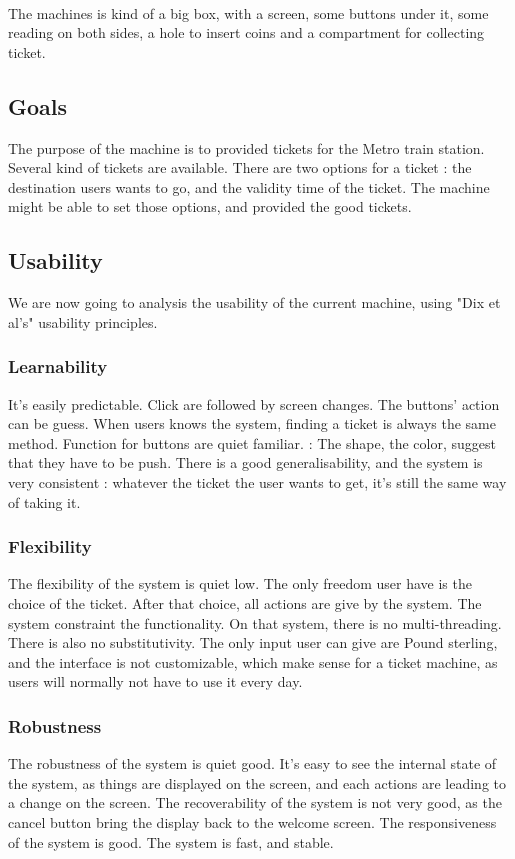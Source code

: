 \documentclass[a4paper,12pt]{article} %
\begin{document}
\paragraph{}The machines is kind of a big box, with a screen, some buttons under it, some reading on both sides, a hole to insert coins and a compartment for collecting ticket.
\subsection{Goals}
The purpose of the machine is to provided tickets for the Metro train station. Several kind of tickets are available. There are two options for a ticket : the destination users wants to go, and the validity time of the ticket. The machine might be able to set those options, and provided the good tickets.
\subsection{Usability}
We are now going to analysis the usability of the current machine, using "Dix et al's" usability principles.
\subsubsection{Learnability}
It's easily predictable. Click are followed by screen changes. The buttons' action can be guess. When users knows the system, finding a ticket is always the same method. Function for buttons are quiet familiar. : The shape, the color, suggest that they have to be push. There is a good generalisability, and the system is very consistent : whatever the ticket the user wants to get, it's still the same way of taking it.
\subsubsection{Flexibility}
The flexibility of the system is quiet low. The only freedom user have is the choice of the ticket. After that choice, all actions are give by the system. The system constraint the functionality. On that system, there is no multi-threading.  There is also no substitutivity. The only input user can give are Pound sterling, and the interface is not customizable, which make sense for a ticket machine, as users will normally not have to use it every day.
\subsubsection{Robustness}
The robustness of the system is quiet good. It's easy to see the internal state of the system, as things are displayed on the screen, and each actions are leading to a change on the screen. The recoverability of the system is not very good, as the cancel button bring the display back to the welcome screen. The responsiveness of the system is good. The system is fast, and stable.
\end{document}
